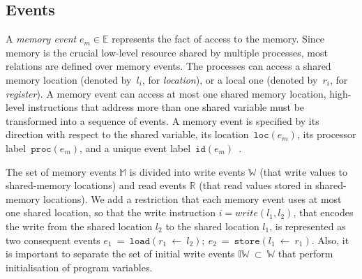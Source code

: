 

\subsection{Events}
\label{ch:wmm:model:events}



A \textit{memory event} $e_m \in \mathbb{E}$ represents the fact of access to the memory. Since memory is the crucial low-level resource shared by multiple processes, most relations are defined over memory events. 
The processes can access a shared memory location (denoted by~$l_i$, for \textit{location}), or a local one (denoted by~$r_i$, for \textit{register}).
A memory event can access at most one shared memory location, high-level instructions that address more than one shared variable must be transformed into a sequence of events.
A memory event is specified by its direction with respect to the shared variable, its location~$\mathtt{loc}(e_m)$, its processor label~$\mathtt{proc}(e_m)$, and a unique event label~$\mathtt{id}(e_m)$~\cite{alglave2010shared}.

The set of memory events $\mathbb{M}$ is divided into write events $\mathbb{W}$ (that write values to shared-memory locations) and read events $\mathbb{R}$ (that read values stored in shared-memory locations).
We add a restriction that each memory event uses at most one shared location, so that the write instruction $i = write(l_1, l_2)$, that encodes the write from the shared location $l_2$ to the shared location $l_1$, is represented as two consequent events $e_1~=~\mathtt{load}(r_1~\leftarrow~l_2); \ e_2~=~\mathtt{store}(l_1~\leftarrow~r_1)$.
Also, it is important to separate the set of initial write events $\mathbb{IW}~\subset~\mathbb{W}$ that perform initialisation of program variables.

